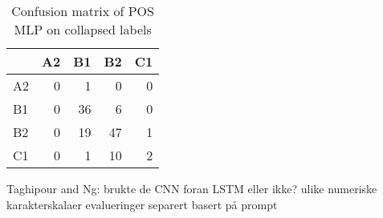\begin{table}
  \centering
  \begin{tabular}{|l|rrrr|}
    \toprule
       & A2 & B1 & B2 & C1 \\
    \midrule
    A2 &  0 &  1 &  0 &  0 \\
    B1 &  0 & 36 &  6 &  0 \\
    B2 &  0 & 19 & 47 &  1 \\
    C1 &  0 &  1 & 10 &  2 \\
    \bottomrule
  \end{tabular}
  \caption{Confusion matrix of POS MLP on collapsed labels}
  \label{confusion-collapsed}
\end{table}

Taghipour and Ng:
brukte de CNN foran LSTM eller ikke?
ulike numeriske karakterskalaer
evalueringer separert basert på prompt
